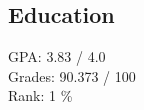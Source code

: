 \documentclass[letterpaper]{twentysecondcv} %
\begin{document}
\begin{CJK*}{UTF8}{gbsn}








\makeprofile %

\section{Education}

GPA: 3.83 / 4.0\\
Grades: 90.373 / 100\\
Rank: 1 \%\\\\



\end{CJK*}
\end{document}
